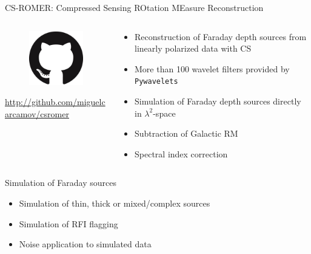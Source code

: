 \documentclass[xetex,aspectratio=169]{beamer}
\begin{document}
\begin{frame}{CS-ROMER: Compressed Sensing ROtation MEasure Reconstruction}
	\begin{columns}[onlytextwidth,t]
		\begin{column}{.5\textwidth}
			\begin{figure}
				\centering
				\includegraphics[scale=0.5]{figures/logos/GitHub-Mark-120px-plus.png}
			\end{figure}

			\url{http://github.com/miguelcarcamov/csromer}
		\end{column}
		\begin{column}{.5\textwidth}
			\begin{itemize}
				\item Reconstruction of Faraday depth sources from linearly polarized data with CS
				\item More than 100 wavelet filters provided by {\tt Pywavelets}
				\item Simulation of Faraday depth sources directly in $\lambda^2$-space
				\item Subtraction of Galactic RM
				\item Spectral index correction
			\end{itemize}
		\end{column}%

	\end{columns}
\end{frame}

\begin{frame}{Simulation of Faraday sources}
	\begin{itemize}
		\item Simulation of thin, thick or mixed/complex sources
		\item Simulation of RFI flagging
		\item Noise application to simulated data
	\end{itemize}

\end{frame}
\end{document}
